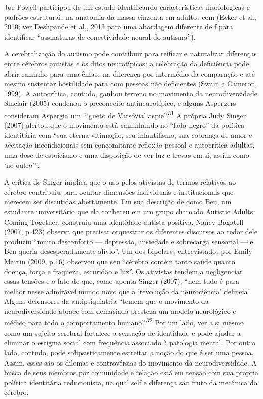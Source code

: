 Joe Powell participou de um estudo identificando características
morfológicas e padrões estruturais na anatomia da massa cinzenta em
adultos com  (Ecker et al., 2010; ver Deshpande et al., 2013 para uma
abordagem diferente de f para identificar ``assinaturas de
conectividade neural do autismo'').

A cerebralização do autismo pode contribuir para reificar e naturalizar
diferenças entre cérebros autistas e os ditos neurotípicos; a celebração
da deficiência pode abrir caminho para uma ênfase na diferença por
intermédio da comparação e até mesmo sustentar hostilidade para com
pessoas não deficientes (Swain e Cameron, 1999). A autocrítica, contudo,
ganhou terreno no movimento da neurodiversidade. Sinclair (2005)
condenou o preconceito antineurotípico, e alguns Aspergers consideram
Aspergia um ```gueto de Varsóvia' aspie''.\textsuperscript{31} A própria
Judy Singer (2007) alertou que o movimento está caminhando no ``lado
negro'' da política identitária com ``sua eterna vitimação, seu
infantilismo, sua cobrança de amor e aceitação incondicionais sem
concomitante reflexão pessoal e autocrítica adultas, uma dose de
estoicismo e uma disposição de ver luz e trevas em si, assim como `no
outro'''.

A crítica de Singer implica que o uso pelos ativistas de termos
relativos ao cérebro contribuiu para ocultar dimensões individuais e
institucionais que merecem ser discutidas abertamente. Em sua descrição
de como Ben, um estudante universitário que ela conheceu em um grupo
chamado Autistic Adults Coming Together, construiu uma identidade
autista positiva, Nancy Bagatell (2007, p.423) observa que precisar
orquestrar os diferentes discursos ao redor dele produziu ``muito
desconforto --- depressão, ansiedade e sobrecarga sensorial --- e Ben
queria desesperadamente alívio''. Um dos bipolares entrevistados por
Emily Martin (2009, p.16) observou que seu ``cérebro contém tanto saúde
quanto doença, força e fraqueza, escuridão e luz''. Os ativistas tendem
a negligenciar essas tensões e o fato de que, como aponta Singer (2007),
``nem tudo é para melhor nesse admirável mundo novo que a `revolução da
neurociência' delineia''. Alguns defensores da antipsiquiatria ``temem
que o movimento da neurodiversidade abrace com demasiada presteza um
modelo neurológico e médico para todo o comportamento
humano''.\textsuperscript{32} Por um lado, ver a si mesmo como um
sujeito cerebral fortalece a sensação de identidade e pode ajudar a
eliminar o estigma social com frequência associado à patologia mental.
Por outro lado, contudo, pode solipsisticamente estreitar a noção do que
é ser uma pessoa. Assim, esses são os dilemas e controvérsias do
movimento da neurodiversidade. A busca de seus membros por comunidade e
relação está em tensão com sua própria política identitária
reducionista, na qual self e diferença são fruto da mecânica do cérebro.

